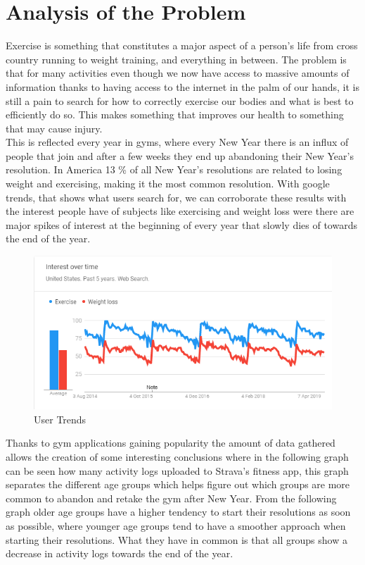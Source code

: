 \chapter{Analysis of the Problem}\label{sec:chap:3}
Exercise is something that constitutes a major aspect of a person’s life from cross country running to weight training, and everything in between. The problem is that for many activities even though we now have access to massive amounts of information thanks to having access to the internet in the palm of our hands, it is still a pain to search for how to correctly exercise our bodies and what is best to efficiently do so. This makes something that improves our health to something that may cause injury.\\

 
This is reflected every year in gyms, where every New Year there is an influx of people that join and after a few weeks they end up abandoning their New Year’s resolution. In America 13 \% of all New Year’s resolutions are related to losing weight and exercising, making it the most common resolution. With google trends, that shows what users search for, we can corroborate these results with the interest people have of subjects like exercising and weight loss were there are major spikes of interest at the beginning of every year that slowly dies of towards the end of the year.\cite{newyear}


\begin{center}
	\begin{figure}[h!]
		\centering
		\includegraphics[scale=0.9]{./images/2-new-year-exercise}
		\caption{User Trends}
		\label{user-trends-gym}
	\end{figure}
\end{center}

Thanks to gym applications gaining popularity the amount of data gathered allows the creation of some interesting conclusions where in the following graph can be seen how many activity logs uploaded to Strava’s fitness app, this graph separates the different age groups which helps figure out which groups are more common to abandon and retake the gym after New Year. From the following graph older age groups have a higher tendency to start their resolutions as soon as possible, where younger age groups tend to have a smoother approach when starting their resolutions. What they have in common is that all groups show a decrease in activity logs towards the end of the year.\cite{newyear}\\

